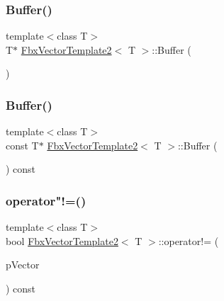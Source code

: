 \subsubsection{\texorpdfstring{Buffer()}{Buffer()}\hspace{0.1cm}{\footnotesize\ttfamily [1/2]}}
{\footnotesize\ttfamily template$<$class T$>$ \\
T$\ast$ \hyperlink{class_fbx_vector_template2}{Fbx\+Vector\+Template2}$<$ T $>$\+::Buffer (\begin{DoxyParamCaption}{ }\end{DoxyParamCaption})}

\mbox{\label{class_fbx_vector_template2_a804f4c622838c2bbef16fb6878033741}} 
\subsubsection{\texorpdfstring{Buffer()}{Buffer()}\hspace{0.1cm}{\footnotesize\ttfamily [2/2]}}
{\footnotesize\ttfamily template$<$class T$>$ \\
const T$\ast$ \hyperlink{class_fbx_vector_template2}{Fbx\+Vector\+Template2}$<$ T $>$\+::Buffer (\begin{DoxyParamCaption}{ }\end{DoxyParamCaption}) const}

\mbox{\label{class_fbx_vector_template2_a892290b45c2afa593e89c8c8ee7ab51d}} 
\subsubsection{\texorpdfstring{operator"!=()}{operator!=()}}
{\footnotesize\ttfamily template$<$class T$>$ \\
bool \hyperlink{class_fbx_vector_template2}{Fbx\+Vector\+Template2}$<$ T $>$\+::operator!= (\begin{DoxyParamCaption}\item[{const \hyperlink{class_fbx_vector_template2}{Fbx\+Vector\+Template2}$<$ T $>$ \&}]{p\+Vector }\end{DoxyParamCaption}) const}

